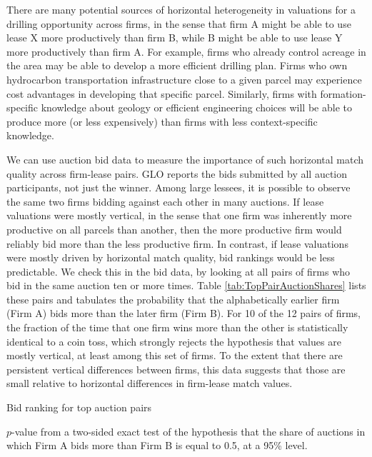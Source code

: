 There are many potential sources of horizontal heterogeneity in valuations for a drilling opportunity across firms, in the sense that firm A might be able to use lease X more productively than firm B, while B might be able to use lease Y more productively than firm A. For example, firms who already control acreage in the area may be able to develop a more efficient drilling plan. Firms who own hydrocarbon transportation infrastructure close to a given parcel may experience cost advantages in developing that specific parcel.  Similarly, firms with formation-specific knowledge about geology or efficient engineering choices will be able to produce more (or less expensively) than firms with less context-specific knowledge.

We can use auction bid data to measure the importance of such horizontal match quality across firm-lease pairs. GLO reports the bids submitted by all auction participants, not just the winner. Among large lessees, it is possible to observe the same two firms bidding against each other in many auctions.  If lease valuations were mostly vertical, in the sense that one firm was inherently more productive on all parcels than another, then the more productive firm would  reliably bid more than the less productive firm.  In contrast, if lease valuations were mostly driven by horizontal match quality, bid rankings would be less predictable. We check this in the bid data, by looking at all pairs of firms who bid in the same auction ten or more times.  Table \ref{tab:TopPairAuctionShares} lists these pairs and tabulates the probability that the alphabetically earlier firm (Firm A) bids more than the later firm (Firm B).  For 10 of the 12 pairs of firms, the fraction of the time that one firm wins more than the other is statistically identical to a coin toss, which strongly rejects the hypothesis that values are mostly vertical, at least among this set of firms.  To the extent that there are persistent vertical differences between firms, this data suggests that those are small relative to horizontal differences in firm-lease match values.  

\begin{table}[htpb]
	\begin{center}
	\begin{threeparttable}
		\caption{Bid ranking for top auction pairs}
		\label{tab:TopPairAuctionShares}
		\small
		            
		\begin{tablenotes}
			\footnotesize
			\item $p$-value from a two-sided exact test of the hypothesis that the share of auctions in which Firm A bids more than Firm B is equal to 0.5, at a 95\% level.   
			\end{tablenotes}        
	\end{threeparttable}
	\end{center}
\end{table}

